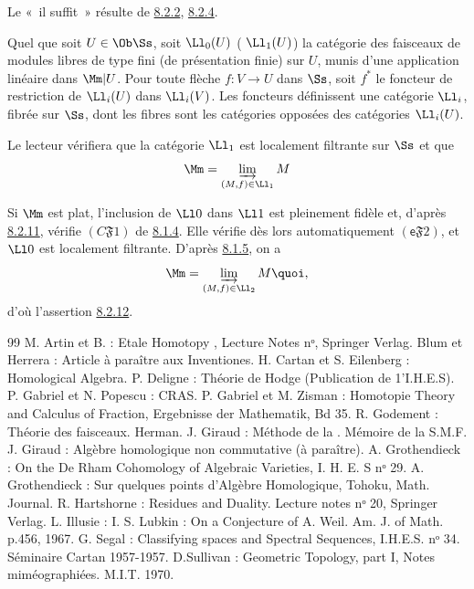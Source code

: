 Le « il suffit » résulte de \hyperref[V.thm8.2.2]{8.2.2}, \hyperref[V.prop8.2.4]{8.2.4}.

Quel que soit $U \in \Ob \Ss$, soit $\Ll_0(U)$ (\resp
$\Ll_1(U)$) la catégorie des faisceaux de modules libres de
type fini (\resp de présentation finie) sur $U$, munis d'une
application linéaire dans $\Mm | U$. Pour toute flèche $f : V \to U$
dans $\Ss$, soit $f^{\ast}$ le foncteur de restriction de $\Ll_i(U)$
dans $\Ll_i(V)$. Les foncteurs définissent une catégorie
$\Ll_i$, fibrée sur $\Ss$, dont les fibres sont les catégories
opposées des catégories $\Ll_i(U)$.

Le lecteur vérifiera que la catégorie $\Ll_1$ est localement
filtrante sur $\Ss$ et que
$$
\Mm = \varinjlim_{(M , f) \in \Ll_1} M
$$

Si $\Mm$ est plat, l'inclusion de $\Ll0$ dans
$\Ll1$ est pleinement fidèle et, d'après \hyperref[V.lem8.2.11]{8.2.11}, vérifie $(C
\mathfrak{F} 1)$ de \hyperref[V.def8.1.4]{8.1.4}. Elle vérifie dès lors automatiquement
$(\mathsf{e} \mathfrak{F} 2)$, et $\Ll0$ est localement
filtrante. D'après \hyperref[V.prop8.1.5]{8.1.5}, on a
$$
\Mm = \varinjlim_{(M, f)\in \Ll_2} M{\quoi},
$$
d'où l'assertion \hyperref[V.thm8.2.12]{8.2.12}.

\begin{thebibliography}{99}\pageoriginale
{} M. Artin et B.  : Etale Homotopy , Lecture Notes nᵒ, Springer Verlag.
 Blum et Herrera : Article à paraître aux Inventiones.
 H. Cartan et S. Eilenberg : Homological Algebra.
 P. Deligne : Théorie de Hodge (Publication de 1'I.H.E.S).
 P. Gabriel et N. Popescu : CRAS.
 P. Gabriel et M. Zisman : Homotopie Theory and Calculus of
  Fraction, Ergebnisse der Mathematik, Bd 35.
 R. Godement : Théorie des faisceaux. Herman.
 J. Giraud : Méthode de la . Mémoire de la S.M.F.
 J. Giraud : Algèbre homologique non commutative (à paraître).
 A. Grothendieck : On the De Rham Cohomology of Algebraic
  Varieties, I. H. E. S nᵒ 29.
 A. Grothendieck : Sur quelques points d'Algèbre Homologique,
  Tohoku, Math. Journal.
 R. Hartshorne : Residues and Duality. Lecture notes
  nᵒ 20, Springer Verlag.
 L. Illusie :  I.
 S. Lubkin : On a Conjecture of A. Weil. Am. J. of
  Math. p.456, 1967.
 G. Segal : Classifying spaces and Spectral Sequences,
  I.H.E.S. nᵒ 34.
 Séminaire Cartan 1957-1957.
 D.Sullivan : Geometric Topology, part I, Notes
  miméographiées. M.I.T. 1970.
\end{thebibliography}

\ifx\danslelivre\undefined

\fi
